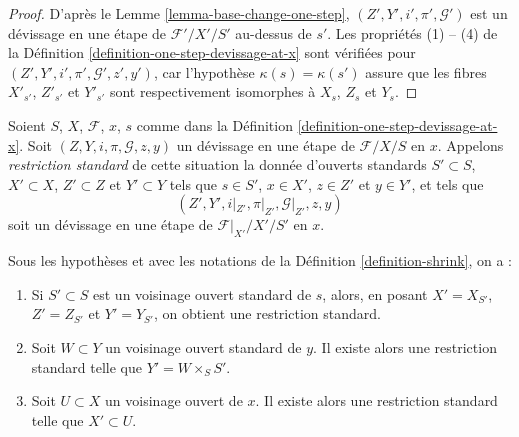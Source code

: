 \begin{proof}
D'après le
Lemme \ref{lemma-base-change-one-step},
$(Z', Y', i', \pi', \mathcal{G}')$ est un d\'evissage en une étape de
$\mathcal{F}'/X'/S'$ au-dessus de $s'$. Les propriétés (1) -- (4) de la
Définition \ref{definition-one-step-devissage-at-x}
sont vérifiées pour $(Z', Y', i', \pi', \mathcal{G}', z', y')$,
car l'hypothèse $\kappa(s) = \kappa(s')$ assure que les fibres
$X'_{s'}$, $Z'_{s'}$ et $Y'_{s'}$ sont respectivement isomorphes à
$X_s$, $Z_s$ et $Y_s$.
\end{proof}

\begin{definition}
\label{definition-shrink}
Soient $S$, $X$, $\mathcal{F}$, $x$, $s$ comme dans la
Définition \ref{definition-one-step-devissage-at-x}.
Soit $(Z, Y, i, \pi, \mathcal{G}, z, y)$ un d\'evissage en une étape
de $\mathcal{F}/X/S$ en $x$. Appelons
{\it restriction standard} de cette situation la donnée
d'ouverts standards $S' \subset S$, $X' \subset X$, $Z' \subset Z$
et $Y' \subset Y$ tels que $s \in S'$, $x \in X'$, $z \in Z'$ et
$y \in Y'$, et tels que
$$
(Z', Y', i|_{Z'}, \pi|_{Z'}, \mathcal{G}|_{Z'}, z, y)
$$
soit un d\'evissage en une étape de $\mathcal{F}|_{X'}/X'/S'$ en $x$.
\end{definition}

\begin{lemma}
\label{lemma-shrink}
Sous les hypothèses et avec les notations de la
Définition \ref{definition-shrink},
on a :
\begin{enumerate}
\item
\label{item-shrink-base}
Si $S' \subset S$ est un voisinage ouvert standard de $s$, alors,
en posant $X' = X_{S'}$, $Z' = Z_{S'}$ et $Y' = Y_{S'}$, on obtient une
restriction standard.
\item
\label{item-shrink-on-Y}
Soit $W \subset Y$ un voisinage ouvert standard de $y$.
Il existe alors une restriction standard telle que $Y' = W \times_S S'$.
\item
\label{item-shrink-on-X}
Soit $U \subset X$ un voisinage ouvert de $x$.
Il existe alors une restriction standard telle que $X' \subset U$.
\end{enumerate}
\end{lemma}

